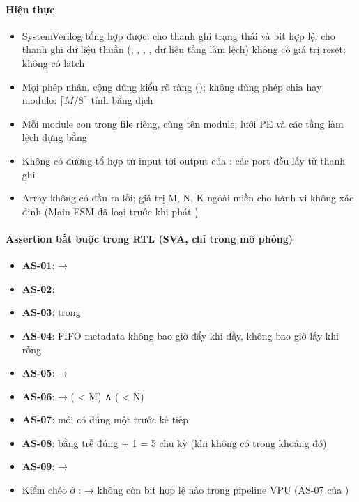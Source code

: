 \documentclass[10pt,a4paper]{article}
\begin{document}
\paragraph{Hiện thực}\label{par:8-1}
\begin{itemize}
\item SystemVerilog tổng hợp được;  cho thanh ghi trạng thái và bit hợp lệ,  cho thanh ghi dữ liệu thuần (, , , , dữ liệu tầng làm lệch) không có giá trị reset; không có latch
\item Mọi phép nhân, cộng dùng kiểu  rõ ràng (); không dùng phép chia hay modulo: $\lceil M/8\rceil$ tính bằng dịch
\item Mỗi module con trong file riêng, cùng tên module; lưới PE và các tầng làm lệch dựng bằng 
\item Không có đường tổ hợp từ input tới output của : các port  đều lấy từ thanh ghi
\item Array không có đầu ra lỗi; giá trị M, N, K ngoài miền cho hành vi không xác định (Main FSM đã loại trước khi phát )
\end{itemize}

\paragraph{Assertion bắt buộc trong RTL (SVA, chỉ trong mô phỏng)}\label{par:8-2}
\begin{itemize}
\item \textbf{AS-01}:  → 
\item \textbf{AS-02}: 
\item \textbf{AS-03}:  trong 
\item \textbf{AS-04}: FIFO metadata không bao giờ đẩy khi đầy, không bao giờ lấy khi rỗng
\item \textbf{AS-05}:  → 
\item \textbf{AS-06}:  → ( < M) ∧ ( < N)
\item \textbf{AS-07}: mỗi  có đúng một  trước  kế tiếp
\item \textbf{AS-08}:  bằng  trễ đúng  + 1 = 5 chu kỳ (khi không có  trong khoảng đó)
\item \textbf{AS-09}:  → 
\item Kiểm chéo ở :  → không còn bit hợp lệ nào trong pipeline VPU (AS-07 của )
\end{itemize}
\end{document}
